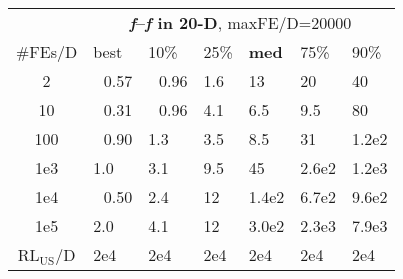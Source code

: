 \begin{tabular}{c|llllll}
 & \multicolumn{6}{|c}{\textbf{\textit{f}\raisebox{-0.35ex}{1}--\textit{f}\raisebox{-0.35ex}{24} in 20-D}, maxFE/D=20000}\\
\#FEs/D & best & 10\% & 25\% & \textbf{med} & 75\% & 90\%\\
2 & ~\,0.57 & ~\,0.96 & \hspace*{1ex}1.6 & 13 & 20 & 40\\
10 & ~\,0.31 & ~\,0.96 & \hspace*{1ex}4.1 & \hspace*{1ex}6.5 & \hspace*{1ex}9.5 & 80\\
100 & ~\,0.90 & \hspace*{1ex}1.3 & \hspace*{1ex}3.5 & \hspace*{1ex}8.5 & 31 & 1.2e2\\
1e3 & \hspace*{1ex}1.0 & \hspace*{1ex}3.1 & \hspace*{1ex}9.5 & 45 & 2.6e2 & 1.2e3\\
1e4 & ~\,0.50 & \hspace*{1ex}2.4 & 12 & 1.4e2 & 6.7e2 & 9.6e2\\
1e5 & \hspace*{1ex}2.0 & \hspace*{1ex}4.1 & 12 & 3.0e2 & 2.3e3 & 7.9e3\\
$\text{RL}_{\text{US}}$/D & 2e4 & 2e4 & 2e4 & 2e4 & 2e4 & 2e4
\end{tabular}
